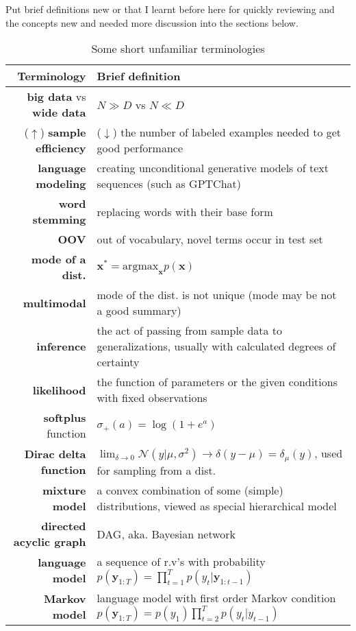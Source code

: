 \begin{table}[htpb]
    \centering
    \caption{Some short unfamiliar terminologies}
    {\footnotesize
    Put brief definitions new or that I learnt before here for quickly reviewing 
and the concepts new and needed more discussion into the sections below.\\
}
    {\small
    \begin{tabular}{rp{32em}}
        \toprule
        Terminology & Brief definition \\
        \midrule
        \textbf{big data} vs \textbf{wide data} & $N\gg{D}$ vs $N\ll{D}$ \\
        ($\uparrow$) \textbf{sample efficiency} & ($\downarrow$) the number of labeled examples needed to get good performance \\
        \textbf{language modeling} & creating unconditional generative models of text sequences (such as GPTChat)\\
        \textbf{word stemming} & replacing words with their base form\\
        \textbf{OOV} & out of vocabulary, novel terms occur in test set\\
        \textbf{mode of a dist.} & $\bm{x}^*=\mathrm{argmax}_{\bm{x}}p(\bm{x})$ \\
        \textbf{multimodal} & mode of the dist. is not unique (mode may be not a good summary)\\
        \textbf{inference} & the act of passing from sample data to generalizations, usually with calculated degrees of certainty\\
        \textbf{likelihood} & the function of parameters or the given conditions with fixed observations\\
        \textbf{softplus} function & $\sigma_+(a)=\log{(1+e^a)}$\\
        \textbf{Dirac delta function} & $\lim_{\delta\to{0}}{\mathcal{N}(y|\mu,\sigma^2)}\to\delta(y-\mu)=\delta_\mu(y)$, used for sampling from a dist.\\
        \textbf{mixture model} & a convex combination of some (simple) distributions, viewed as special hierarchical model\\
        \textbf{directed acyclic graph} & DAG, aka. Bayesian network\\
        \textbf{language model} & a sequence of r.v's with probability $p(\bm{y}_{1:T})=\prod_{t=1}^T{p(y_t|\bm{y}_{1:t-1})}$\\
        \textbf{Markov model} & language model with first order Markov condition $p(\bm{y}_{1:T})=p(y_1)\prod_{t=2}^T{p(y_t|y_{t-1})}$\\

\end{tabular}}
\end{table}
